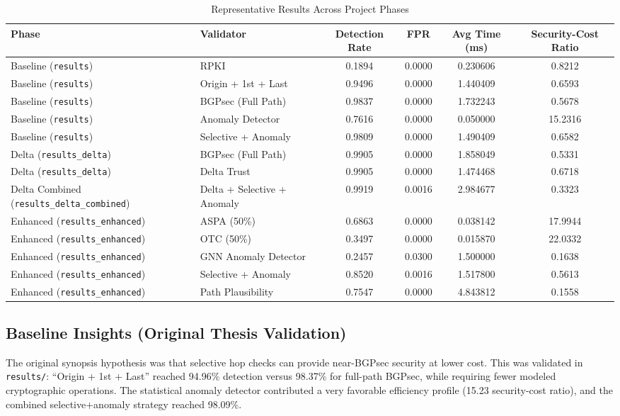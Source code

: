 \documentclass[conference]{IEEEtran}
\begin{document}
\begin{table}[t]
\caption{Representative Results Across Project Phases}
\label{tab:phase_summary}
\centering
\begin{tabular}{@{}l l c c c c@{}}
\toprule
\textbf{Phase} & \textbf{Validator} & \textbf{Detection Rate} & \textbf{FPR} & \textbf{Avg Time (ms)} & \textbf{Security-Cost Ratio} \\
\midrule
Baseline (\texttt{results}) & RPKI & 0.1894 & 0.0000 & 0.230606 & 0.8212 \\
Baseline (\texttt{results}) & Origin + 1st + Last & 0.9496 & 0.0000 & 1.440409 & 0.6593 \\
Baseline (\texttt{results}) & BGPsec (Full Path) & 0.9837 & 0.0000 & 1.732243 & 0.5678 \\
Baseline (\texttt{results}) & Anomaly Detector & 0.7616 & 0.0000 & 0.050000 & 15.2316 \\
Baseline (\texttt{results}) & Selective + Anomaly & 0.9809 & 0.0000 & 1.490409 & 0.6582 \\
\midrule
Delta (\texttt{results\_delta}) & BGPsec (Full Path) & 0.9905 & 0.0000 & 1.858049 & 0.5331 \\
Delta (\texttt{results\_delta}) & Delta Trust & 0.9905 & 0.0000 & 1.474468 & 0.6718 \\
Delta Combined (\texttt{results\_delta\_combined}) & Delta + Selective + Anomaly & 0.9919 & 0.0016 & 2.984677 & 0.3323 \\
\midrule
Enhanced (\texttt{results\_enhanced}) & ASPA (50\%) & 0.6863 & 0.0000 & 0.038142 & 17.9944 \\
Enhanced (\texttt{results\_enhanced}) & OTC (50\%) & 0.3497 & 0.0000 & 0.015870 & 22.0332 \\
Enhanced (\texttt{results\_enhanced}) & GNN Anomaly Detector & 0.2457 & 0.0300 & 1.500000 & 0.1638 \\
Enhanced (\texttt{results\_enhanced}) & Selective + Anomaly & 0.8520 & 0.0016 & 1.517800 & 0.5613 \\
Enhanced (\texttt{results\_enhanced}) & Path Plausibility & 0.7547 & 0.0000 & 4.843812 & 0.1558 \\
\bottomrule
\end{tabular}
\end{table}

\subsection{Baseline Insights (Original Thesis Validation)}
The original synopsis hypothesis was that selective hop checks can provide near-BGPsec security at lower cost. This was validated in \texttt{results/}: ``Origin + 1st + Last'' reached 94.96\% detection versus 98.37\% for full-path BGPsec, while requiring fewer modeled cryptographic operations. The statistical anomaly detector contributed a very favorable efficiency profile (15.23 security-cost ratio), and the combined selective+anomaly strategy reached 98.09\%.
\end{document}
